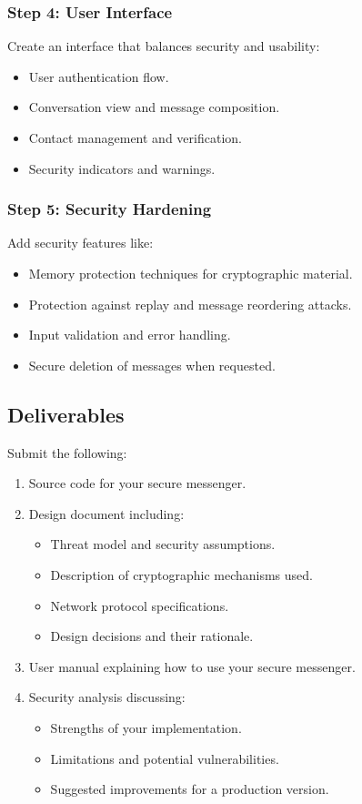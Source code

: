 \documentclass[10pt,a4paper,american]{exam}
\begin{document}
\subsubsection*{Step 4: User Interface}
Create an interface that balances security and usability:
\begin{itemize}
	\item User authentication flow.
	\item Conversation view and message composition.
	\item Contact management and verification.
	\item Security indicators and warnings.
\end{itemize}

\subsubsection*{Step 5: Security Hardening}
Add security features like:
\begin{itemize}
	\item Memory protection techniques for cryptographic material.
	\item Protection against replay and message reordering attacks.
	\item Input validation and error handling.
	\item Secure deletion of messages when requested.
\end{itemize}

\subsection*{Deliverables}
Submit the following:

\begin{enumerate}
	\item Source code for your secure messenger.
	\item Design document including:
	      \begin{itemize}
		      \item Threat model and security assumptions.
		      \item Description of cryptographic mechanisms used.
		      \item Network protocol specifications.
		      \item Design decisions and their rationale.
	      \end{itemize}
	\item User manual explaining how to use your secure messenger.
	\item Security analysis discussing:
	      \begin{itemize}
		      \item Strengths of your implementation.
		      \item Limitations and potential vulnerabilities.
		      \item Suggested improvements for a production version.
	      \end{itemize}
\end{enumerate}
\end{document}
